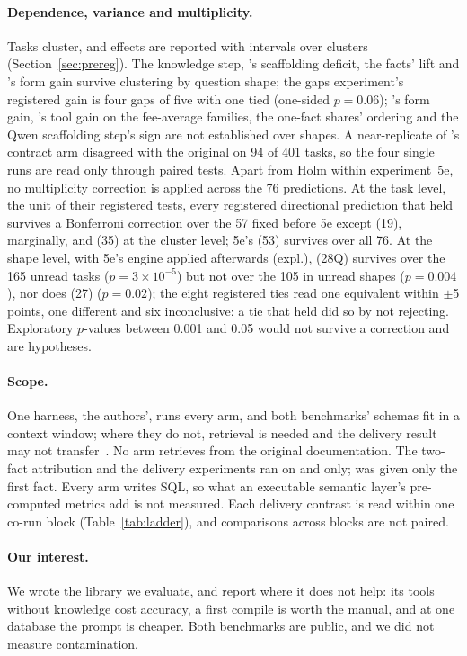 \paragraph{Dependence, variance and multiplicity.}\label{sec:power} Tasks
cluster, and effects are reported with intervals over clusters
(Section~\ref{sec:prereg}). The knowledge step, \mSol{}'s scaffolding
deficit, the facts' lift and \mLuna{}'s form gain survive clustering by
question shape; the gaps experiment's registered gain is four gaps of
five with one tied (one-sided $p{=}0.06$); \mQwen{}'s form gain, \mLuna{}'s
tool gain on the fee-average families, the one-fact shares' ordering and
the Qwen scaffolding step's sign are not established over shapes.
A near-replicate of \mGLM{}'s contract arm disagreed with the original on
94 of 401 tasks, so the four single runs are read only through paired
tests. Apart from Holm within experiment~5e, no multiplicity correction is
applied across the 76 predictions. At the task level, the unit of their
registered tests, every registered directional prediction that held
survives a Bonferroni correction over the 57 fixed before 5e except (19),
marginally, and (35) at the cluster level; 5e's (53) survives over all 76. At the shape level, with 5e's engine applied afterwards (expl.), (28Q)
survives over the 165 unread tasks ($p{=}3{\times}10^{-5}$) but not over the
105 in unread shapes ($p{=}0.004$), nor does (27) ($p{=}0.02$); the eight
registered ties read one equivalent within $\pm$5 points, one different
and six inconclusive: a tie that held did so by not rejecting. Exploratory
$p$-values between 0.001 and 0.05 would not survive a correction and are
hypotheses.

\paragraph{Scope.} One harness, the authors', runs every arm, and both
benchmarks' schemas fit in a context window; where they do not, retrieval
is needed and the delivery result may not
transfer~\cite{death-schema-linking,spider2}. No arm retrieves from the
original documentation. The two-fact attribution and the delivery
experiments ran on \mLuna{} and \mQwen{} only; \mSol{} was given only the
first fact. Every arm writes SQL, so what an executable semantic layer's
pre-computed metrics add is not measured. Each delivery contrast is read within one co-run block
(Table~\ref{tab:ladder}), and comparisons across blocks are not paired.

\paragraph{Our interest.} We wrote the library we evaluate, and report
where it does not help: its tools without knowledge cost \mSol{}
accuracy, a first compile is worth the manual, and at one database the
prompt is cheaper. Both benchmarks are public, and we did not measure
contamination.


